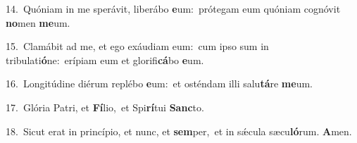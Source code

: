 {\numbfont\textcolor{\numbcolor}{14.}}~Quóniam in me sperávit, liberábo \textbf{e}\-um:~\star prótegam eum quóniam cognóvit \textbf{no}\-men \textbf{me}\-um.\par
{\numbfont\textcolor{\numbcolor}{15.}}~Clamábit ad me, et ego exáudiam eum:~\dagger cum ipso sum in tribulati\-\textbf{ó}\-ne:~\star erípiam eum et glorifi\-\textbf{cá}\-bo \textbf{e}\-um.\par
{\numbfont\textcolor{\numbcolor}{16.}}~Longitúdine diérum replébo \textbf{e}\-um:~\star et osténdam illi salu\-\textbf{tá}\-re \textbf{me}\-um.\par
{\numbfont\textcolor{\numbcolor}{17.}}~Glória Patri, et \textbf{Fí}\-lio,~\star et Spi\-\textbf{rí}\-tui \textbf{Sanc}\-to.\par
{\numbfont\textcolor{\numbcolor}{18.}}~Sicut erat in princípio, et nunc, et \textbf{sem}\-per,~\star et in sǽcula sæcu\-\textbf{ló}\-rum. \textbf{A}\-men.\par
